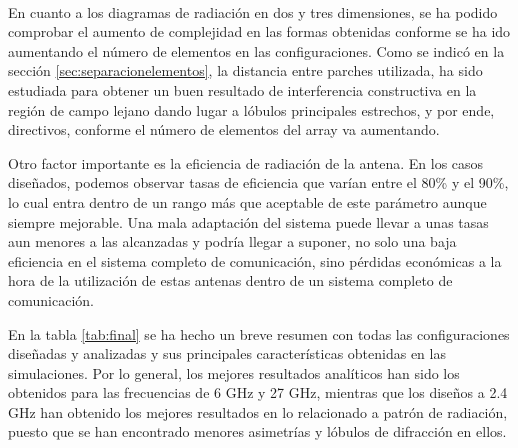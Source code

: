 \\
\par En cuanto a los diagramas de radiación en dos y tres dimensiones, se ha podido comprobar el aumento de complejidad en las formas obtenidas conforme se ha ido aumentando el número de elementos en las configuraciones. Como se indicó en la sección \ref{sec:separacionelementos}, la distancia entre parches utilizada, ha sido estudiada para obtener un buen resultado de interferencia constructiva en la región de campo lejano dando lugar a lóbulos principales estrechos, y por ende, directivos, conforme el número de elementos del array va aumentando.
\\
\par Otro factor importante es la eficiencia de radiación de la antena. En los casos diseñados, podemos observar tasas de eficiencia que varían entre el 80\% y el 90\%, lo cual entra dentro de un rango más que aceptable de este parámetro aunque siempre mejorable. Una mala adaptación del sistema puede llevar a unas tasas aun menores a las alcanzadas y podría llegar a suponer, no solo una baja eficiencia en el sistema completo de comunicación, sino pérdidas económicas a la hora de la utilización de estas antenas dentro de un sistema completo de comunicación.
\\
\par En la tabla \ref{tab:final} se ha hecho un breve resumen con todas las configuraciones diseñadas y analizadas y sus principales características obtenidas en las simulaciones. Por lo general, los mejores resultados analíticos han sido los obtenidos para las frecuencias de 6 GHz y 27 GHz, mientras que los diseños a 2.4 GHz han obtenido los mejores resultados en lo relacionado a patrón de radiación, puesto que se han encontrado menores asimetrías y lóbulos de difracción en ellos.
\\
